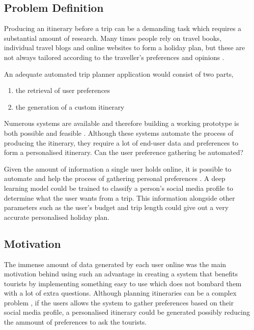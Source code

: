 \subsection{Problem Definition}

        Producing an itinerary before a trip can be a demanding task
        which requires  a substantial amount of  research. Many times
        people rely on travel books, individual travel blogs and
        online websites to form a holiday plan, but these are not
        always tailored according to the traveller’s preferences and
        opinions \cite{DeChoudhury2010}. 

        An adequate automated trip planner application would consist
        of two parts, 
        
        \begin{enumerate}
                \item the retrieval of user preferences 
                \item the generation of a custom itinerary
        \end{enumerate}
        Numerous systems are available and therefore building a
        working prototype is both possible and feasible
        \cite{Sylejmani2017,Chang2016,Sylejmani2012,Sebastia2009a,
        Tumas2009, Vansteenwegen2011,Kurata2013, RamalhoBrilhante2014,
        DeChoudhury2010,DUNSTALL2008a, DiBitonto2010a,Gavalas }.
        Although these systems automate the process of producing the
        itinerary, they require a lot of end-user data and preferences
        to form a personalised itinerary. Can the user preference
        gathering be automated?

        Given the amount of information a single user holds online, it
        is possible to automate and help the process of gathering
        personal preferences \cite{Buraya2017}. A deep learning model
        could be trained to classify a person's social media profile
        to determine what the user wants from a trip. This information
        alongside other parameters such as the user's budget and trip
        length could give out a very accurate personalised holiday
        plan.

\subsection{Motivation}
        The immense amount of data generated by each user online
        \cite{J.Clement2020} was the main motivation behind using such
        an advantage in creating a system that benefits tourists by
        implementing something easy to use which does not bombard them
        with a lot of extra questions. Although planning itineraries
        can be a complex problem \cite{DUNSTALL2008a}, if the users
        allows the system to gather preferences based on their social
        media profile, a personalised itinerary could be generated
        possibly reducing the ammount of preferences to ask the
        tourists.

